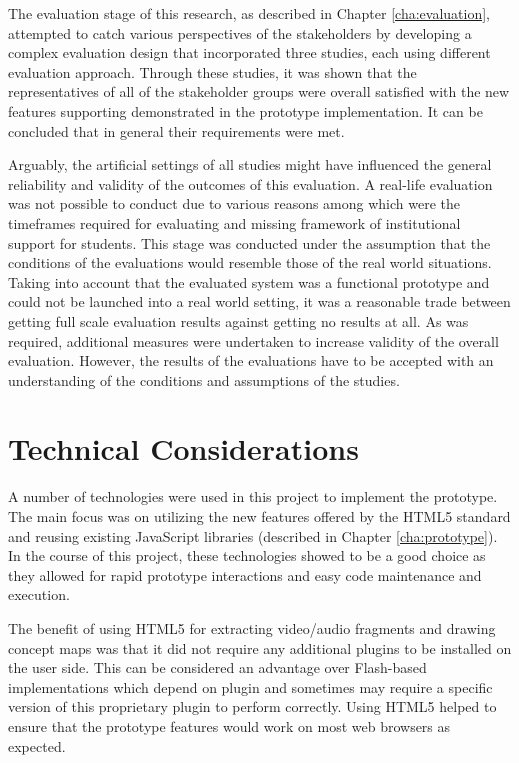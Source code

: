 
The evaluation stage of this research, as described in Chapter
\ref{cha:evaluation}, attempted to catch various perspectives of the stakeholders by developing a
complex evaluation design that incorporated three studies, each using different
evaluation approach. Through these studies, it was shown that the
representatives of all of the stakeholder groups were overall satisfied with the
new features supporting \LLLs demonstrated in the prototype implementation. It
can be concluded that in general their requirements were met.

Arguably, the artificial settings of all studies might have influenced the
general reliability and validity of the outcomes of this evaluation. A real-life
evaluation was not possible to conduct due to various reasons among which were
the timeframes required for evaluating \LLLs and missing framework of
institutional support for students. This stage was conducted under the
assumption that the conditions of the evaluations would resemble those of the
real world situations. Taking into account that the evaluated system was a
functional prototype and could not be launched into a real world setting, it
was a reasonable trade between getting full scale evaluation results against
getting no results at all. As was required, additional measures were undertaken
to increase validity of the overall evaluation. However, the results of the
evaluations have to be accepted with an understanding of the conditions and
assumptions of the studies.

\section{Technical Considerations}
A number of technologies were used in this project to implement the prototype.
The main focus was on utilizing the new features offered by the HTML5 standard
and reusing existing JavaScript libraries (described in Chapter
\ref{cha:prototype}). In the course of this project, these technologies showed
to be a good choice as they allowed for rapid prototype interactions and easy
code maintenance and execution.

The benefit of using HTML5 for extracting video/audio fragments and drawing
concept maps was that it did not require any additional plugins to be installed
on the user side. This can be considered an advantage over Flash-based
implementations which depend on plugin and sometimes may require a specific
version of this proprietary plugin to perform correctly. Using HTML5 helped to
ensure that the prototype features would work on most web browsers as expected.

